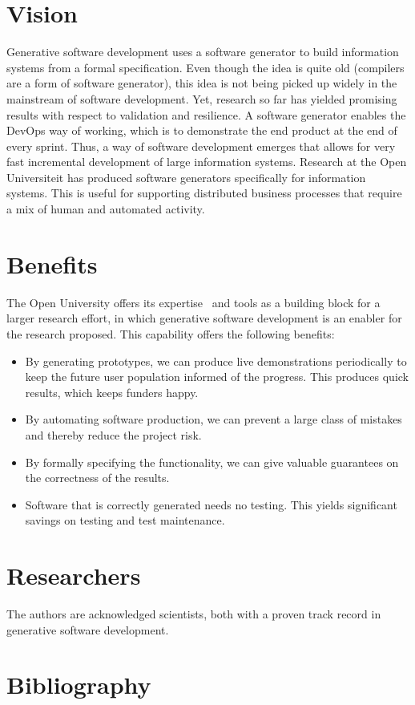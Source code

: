 \documentclass{elsarticle}
\begin{document}
\section{Vision}
   Generative software development uses a software generator to build information systems from a formal specification.
   Even though the idea is quite old (compilers are a form of software generator),
   this idea is not being picked up widely in the mainstream of software development.
   Yet, research so far has yielded promising results with respect to validation and resilience.
   A software generator enables the DevOps way of working, which is to demonstrate the end product at the end of every sprint.
   Thus, a way of software development emerges that allows for very fast incremental development of large information systems.
   Research at the Open Universiteit has produced software generators specifically for information systems.
   This is useful for supporting distributed business processes that require a mix of human and automated activity.

\section{Benefits}
    The Open University offers its expertise~\cite{Joosten-JLAMP2018,JoostenRAMiCS2017,10.1145/3354166.3354182} and tools as a building block for a larger research effort,
    in which generative software development is an enabler for the research proposed.
    This capability offers the following benefits:
\begin{itemize}
    \item By generating prototypes, we can produce live demonstrations periodically to keep the future user population informed of the progress.
    This produces quick results, which keeps funders happy.
    \item By automating software production, we can prevent a large class of mistakes and thereby reduce the project risk.
    \item By formally specifying the functionality, we can give valuable guarantees on the correctness of the results.
    \item Software that is correctly generated needs no testing. This yields significant savings on testing and test maintenance.
\end{itemize}

\section{Researchers}
    The authors are acknowledged scientists, both with a proven track record in generative software development.

    \section{Bibliography}


    
\end{document}
